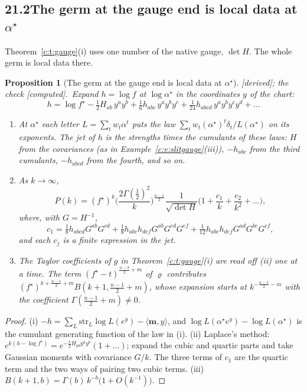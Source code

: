 \documentclass[11pt]{article}
\newcommand{\mvec}{\mathbf m}
\theoremstyle{plain}
\newtheorem{proposition}{Proposition}[section]
\theoremstyle{definition}
\theoremstyle{remark}
\newcommand{\derived}{\textup{[derived]}}
\newcommand{\computed}{\textup{[computed]}}
\begin{document}
\subsection*{21.2\quad The germ at the gauge end is local data at $\alpha^\star$}

Theorem~\ref{c:t:gauge}(i) uses one number of the native gauge, $\det H$. The whole germ is local data there.

\begin{proposition}[The germ at the gauge end is local data at $\alpha^\star$]\label{c:p:jet}\derived; the check \computed.\
Expand $h=\log f$ at $\log\alpha^\star$ in the coordinates $y$ of the chart:
\[
h=\log f^\star-\tfrac12H_{ab}\,y^ay^b+\tfrac16h_{abc}\,y^ay^by^c+\tfrac1{24}h_{abcd}\,y^ay^by^cy^d+\dots
\]
\begin{enumerate}[label=(\roman*)]
\item At $\alpha^\star$ each letter $L=\sum_tw_t\alpha^t$ puts the law $\sum_tw_t(\alpha^\star)^t\delta_t/L(\alpha^\star)$ on its exponents. The jet of $h$ is the strengths times the cumulants of these laws: $H$ from the covariances (as in Example~\ref{c:e:slitgauge}(iii)), $-h_{abc}$ from the third cumulants, $-h_{abcd}$ from the fourth, and so on.
\item As $k\to\infty$,
\[
P(k)=(f^\star)^k\Big(\frac{2\Gamma(\frac12)^2}{k}\Big)^{\frac{n-1}2}\frac{1}{\sqrt{\det H}}\Big(1+\frac{c_1}k+\frac{c_2}{k^2}+\dots\Big),
\]
where, with $G=H^{-1}$,
\[
c_1=\tfrac18h_{abcd}G^{ab}G^{cd}+\tfrac18h_{abc}h_{def}G^{ab}G^{cd}G^{ef}+\tfrac1{12}h_{abc}h_{def}G^{ad}G^{be}G^{cf},
\]
and each $c_j$ is a finite expression in the jet.
\item The Taylor coefficients of $g$ in Theorem~\ref{c:t:gauge}(i) are read off (ii) one at a time. The term $(f^\star-t)^{\frac{n-3}2+m}$ of $\varrho$ contributes $(f^\star)^{k+\frac{n-1}2+m}B(k+1,\frac{n-1}2+m)$, whose expansion starts at $k^{-\frac{n-1}2-m}$ with the coefficient $\Gamma(\frac{n-1}2+m)\neq0$.
\end{enumerate}
\end{proposition}

\begin{proof}
(i) $-h=\sum_L\mathrm{str}_L\log L(e^y)-\langle\mvec,y\rangle$, and $\log L(\alpha^\star e^y)-\log L(\alpha^\star)$ is the cumulant generating function of the law in (i). (ii) Laplace's method: $e^{k(h-\log f^\star)}=e^{-\frac k2H_{ab}y^ay^b}(1+\dots)$; expand the cubic and quartic parts and take Gaussian moments with covariance $G/k$. The three terms of $c_1$ are the quartic term and the two ways of pairing two cubic terms. (iii) $B(k+1,b)=\Gamma(b)\,k^{-b}\big(1+O(k^{-1})\big)$.
\end{proof}
\end{document}
